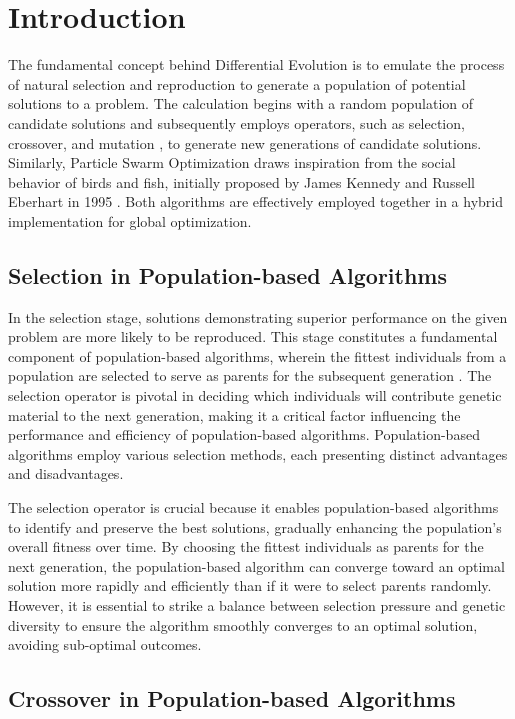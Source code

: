 \documentclass[runningheads]{llncs}
\begin{document}
\section{Introduction}

The fundamental concept behind Differential Evolution is to emulate the process of natural selection and reproduction to generate a population of potential solutions to a problem. The calculation begins with a random population of candidate solutions and subsequently employs operators, such as selection, crossover, and mutation \cite{Lambora-2019}, to generate new generations of candidate solutions. Similarly, Particle Swarm Optimization draws inspiration from the social behavior of birds and fish, initially proposed by James Kennedy and Russell Eberhart in 1995 \cite{Kennedy-1995}. Both algorithms are effectively employed together in a hybrid implementation for global optimization.

\subsection{Selection in Population-based Algorithms}

In the selection stage, solutions demonstrating superior performance on the given problem are more likely to be reproduced. This stage constitutes a fundamental component of population-based algorithms, wherein the fittest individuals from a population are selected to serve as parents for the subsequent generation \cite{Miller-1996}. The selection operator is pivotal in deciding which individuals will contribute genetic material to the next generation, making it a critical factor influencing the performance and efficiency of population-based algorithms. Population-based algorithms employ various selection methods, each presenting distinct advantages and disadvantages.

The selection operator is crucial because it enables population-based algorithms to identify and preserve the best solutions, gradually enhancing the population's overall fitness over time. By choosing the fittest individuals as parents for the next generation, the population-based algorithm can converge toward an optimal solution more rapidly and efficiently than if it were to select parents randomly. However, it is essential to strike a balance between selection pressure and genetic diversity to ensure the algorithm smoothly converges to an optimal solution, avoiding sub-optimal outcomes.

\subsection{Crossover in Population-based Algorithms}
\end{document}
